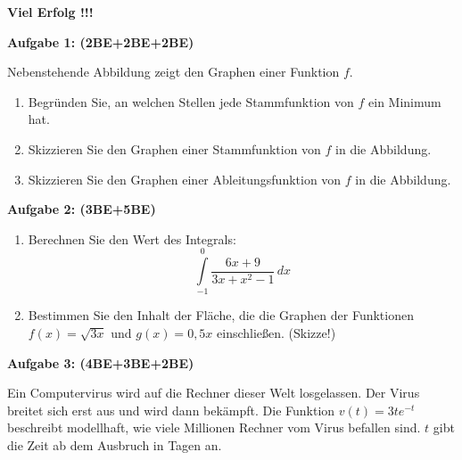 \documentclass[a4paper,12pt]{article}
\newcommand{\Aufgabe}[1]{
  {
  \vspace*{0.5cm}
  \textsf{\textbf{Aufgabe #1}}
  \vspace*{0.2cm}
  
  }
}
\begin{document}
\vspace{5cm}
\centerline{\huge\bfseries\sffamily Viel Erfolg !!!}

\newpage

\Aufgabe{1: (2BE+2BE+2BE)} 

Nebenstehende Abbildung zeigt den Graphen einer Funktion $f$.
  \begin{enumerate}[label={\alph*)}] 
    \item Begründen Sie, an welchen Stellen jede Stammfunktion von $f$ ein Minimum hat.
    \item Skizzieren Sie den Graphen einer Stammfunktion von $f$ in die Abbildung.
    \item Skizzieren Sie den Graphen einer Ableitungsfunktion von $f$ in die Abbildung.
  \end{enumerate}

\begin{center}
\end{center}

\vspace{2cm}

\Aufgabe{2: (3BE+5BE)} 
\begin{enumerate}[label={\alph*)}] 
  \item Berechnen Sie den Wert des Integrals:
    \[ \int\limits_{-1}^{0}\frac{6x+9}{3x+x^2-1}\,dx \]
  \item Bestimmen Sie den Inhalt der Fläche, die die Graphen der Funktionen ${f(x)=\sqrt{3x}}$ und $g(x) = 0,5x$ einschließen. (Skizze!)
\end{enumerate}

\Aufgabe{3: (4BE+3BE+2BE)} 
Ein Computervirus wird auf die Rechner dieser Welt losgelassen. Der Virus breitet sich erst aus und wird dann bekämpft. Die Funktion $v(t)=3t e^{-t}$  beschreibt modellhaft, wie viele Millionen Rechner vom Virus befallen sind. $t$ gibt die Zeit ab dem Ausbruch in Tagen an.
\end{document}
